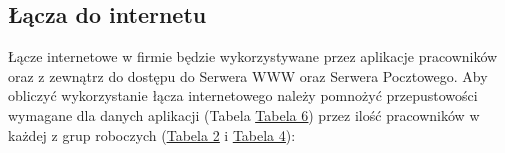 \documentclass[a4paper,12pt]{extarticle}  %
\begin{document}
\subsection{Łącza do internetu}
Łącze internetowe w firmie będzie wykorzystywane przez aplikacje pracowników oraz z
zewnątrz do dostępu do Serwera WWW oraz Serwera Pocztowego.
Aby obliczyć wykorzystanie łącza internetowego należy pomnożyć przepustowości
wymagane dla danych aplikacji (Tabela \underline{\href{tab:apps}{Tabela 6}}) przez ilość pracowników w każdej
z grup roboczych (\underline{\href{tab:groups_sum}{Tabela 2}} i \underline{\href{tab:devices_sum}{Tabela 4}}):
\begin{table}[H]
	\centering
	\caption{Pobór danych przez aplikacje $[kb/s]$}
	\label{tab:app_usage_download}%

\end{table}%
\end{document}
